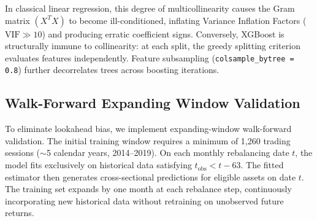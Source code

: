 In classical linear regression, this degree of multicollinearity causes the Gram matrix $(X^T X)$ to become ill-conditioned, inflating Variance Inflation Factors ($\text{VIF} \gg 10$) and producing erratic coefficient signs. Conversely, XGBoost is structurally immune to collinearity: at each split, the greedy splitting criterion evaluates features independently. Feature subsampling (\texttt{colsample\_bytree = 0.8}) further decorrelates trees across boosting iterations.

\subsection{Walk-Forward Expanding Window Validation}
To eliminate lookahead bias, we implement expanding-window walk-forward validation. The initial training window requires a minimum of 1,260 trading sessions ($\sim$5 calendar years, 2014--2019). On each monthly rebalancing date $t$, the model fits exclusively on historical data satisfying $t_{\text{obs}} < t - 63$. The fitted estimator then generates cross-sectional predictions for eligible assets on date $t$. The training set expands by one month at each rebalance step, continuously incorporating new historical data without retraining on unobserved future returns.

